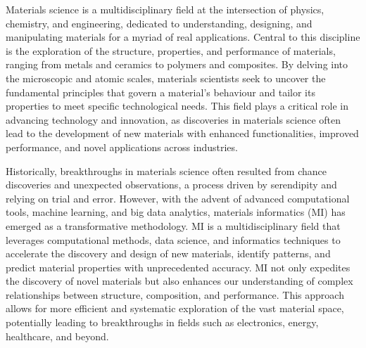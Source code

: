 

Materials science is a multidisciplinary field at the intersection of physics, chemistry, and engineering, dedicated to understanding, designing, and manipulating materials for a myriad of real applications. 
Central to this discipline is the exploration of the structure, properties, and performance of materials, ranging from metals and ceramics to polymers and composites. By delving into the microscopic and atomic scales, materials scientists seek to uncover the fundamental principles that govern a material's behaviour and tailor its properties to meet specific technological needs. 
This field plays a critical role in advancing technology and innovation, as discoveries in materials science often lead to the development of new materials with enhanced functionalities, improved performance, and novel applications across industries.

Historically, breakthroughs in materials science often resulted from chance discoveries and unexpected observations, a process driven by serendipity and relying on trial and error. 
However, with the advent of advanced computational tools, machine learning, and big data analytics, materials informatics (MI) has emerged as a transformative methodology. 
MI is a multidisciplinary field that leverages computational methods, data science, and informatics techniques to accelerate the discovery and design of new materials, identify patterns, and predict material properties with unprecedented accuracy. 
MI not only expedites the discovery of novel materials but also enhances our understanding of complex relationships between structure, composition, and performance. 
This approach allows for more efficient and systematic exploration of the vast material space, potentially leading to breakthroughs in fields such as electronics, energy, healthcare, and beyond. 


